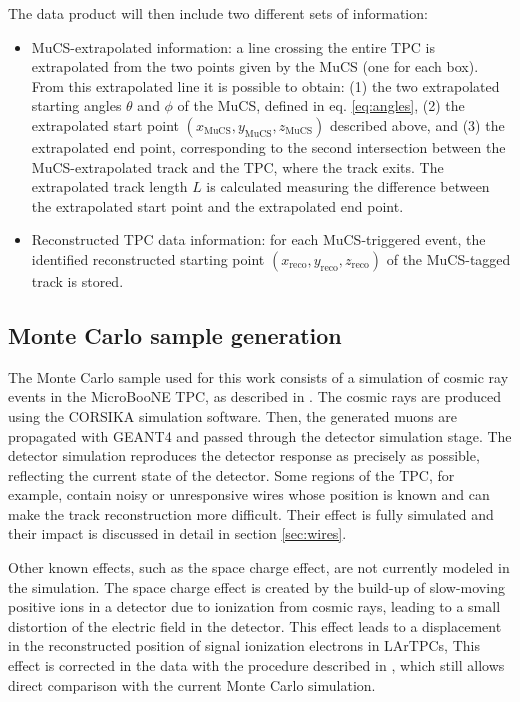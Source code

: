 \documentclass[a4paper,11pt]{article}
\begin{document}
The data product will then include two different sets of information:
\begin{itemize}
  \item MuCS-extrapolated information: a line crossing the entire TPC is extrapolated from the two points given by the MuCS (one for each box). From this extrapolated line it is possible to obtain: (1) the two extrapolated starting angles $\theta$ and $\phi$ of the MuCS, defined in eq. \eqref{eq:angles}, (2) the extrapolated start point $(x_{\mathrm{MuCS}},y_{\mathrm{MuCS}},z_{\mathrm{MuCS}})$ described above, and (3) the extrapolated end point, corresponding to the second intersection between the MuCS-extrapolated track and the TPC, where the track exits. The extrapolated track length $L$ is calculated measuring the difference between the extrapolated start point and the extrapolated end point.
  \item Reconstructed TPC data information: for each MuCS-triggered event, the identified reconstructed starting point $(x_{\mathrm{reco}},y_{\mathrm{reco}},z_{\mathrm{reco}})$ of the MuCS-tagged track is stored.
\end{itemize}

\subsection{Monte Carlo sample generation}\label{sec:mcgen}

The Monte Carlo sample used for this work consists of a simulation of cosmic ray events in the MicroBooNE TPC, as described in \cite{cosmic}. The cosmic rays are produced using the CORSIKA \cite{corsika} simulation software. Then, the generated muons are propagated with GEANT4 \cite{geant} and passed through the detector simulation stage. The detector simulation reproduces the detector response as precisely as possible, reflecting the current state of the detector. Some regions of the TPC, for example, contain noisy or unresponsive wires whose position is known and can make the track reconstruction more difficult. Their effect is fully simulated and their impact is discussed in detail in section \ref{sec:wires}.

Other known effects, such as the space charge effect, are not currently modeled in the simulation. The space charge effect is created by the build-up of slow-moving positive ions in a detector due to ionization from cosmic rays, leading to a small distortion of the electric field in the detector. This effect leads to a displacement in the reconstructed position of signal ionization electrons in LArTPCs, This effect is corrected in the data with the procedure described in \cite{sce}, which still allows direct comparison with the current Monte Carlo simulation.
\end{document}
